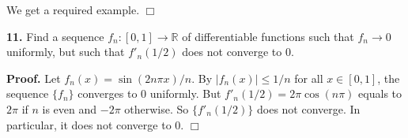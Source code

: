 \documentclass{article}
\begin{document}
We get a required example. $\Box$

    \textbf{11.} Find a sequence $f_n:[0,1]\to \mathbb{R}$ of differentiable
functions such that $f_n \to 0$ uniformly, but such that $f'_n(1/2)$
does not converge to $0$.

\textbf{Proof.} Let $f_n(x) = \sin(2n\pi x)/n$. By $|f_n(x)| \le 1/n$
for all $x \in [0,1]$, the sequence $\{f_n\}$ converges to $0$
uniformly. But $f'_n(1/2) = 2\pi\cos(n\pi)$ equals to $2\pi$ if $n$ is
even and $-2\pi$ otherwise. So $\{f'_n(1/2)\}$ does not converge. In
particular, it does not converge to $0$. $\Box$


    
    
    
    
\end{document}
